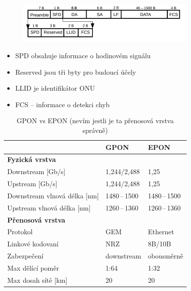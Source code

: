 \begin{figure} [h]
    \centering
    \includegraphics[width=0.8\textwidth]{snimky/EPONframe.png}
\end{figure}

\begin{itemize}
    \item SPD obsahuje informace o hodinovém signálu
    \item Reserved jsou tři byty pro budoucí účely
    \item LLID je identifikátor ONU
    \item FCS -- informace o detekci chyb
\end{itemize}

\clearpage

\begin{table}[ht]
    \centering
    \caption{GPON vs EPON (nevím jestli je ta přenosová vrstva správně)}
    \begin{tabular}{|l|l|l|}
        \hline
                                     & GPON           & EPON           \\\hline\hline
        \textbf{Fyzická vrstva}      &                &                \\\hline\hline
        Downstream [Gb/s]            & 1,244/2,488    & 1,25           \\\hline
        Upstream [Gb/s]              & 1,244/2,488    & 1,25           \\\hline
        Downstream vlnová délka [nm] & 1480\,--\,1500 & 1480\,--\,1500 \\\hline
        Upstream vlnová délka [nm]   & 1260\,--\,1360 & 1260\,--\,1360 \\\hline\hline
        \textbf{Přenosová vrstva}    &                &                \\\hline\hline
        Protokol                     & GEM            & Ethernet       \\\hline
        Linkové kodovaní             & NRZ            & 8B/10B         \\\hline
        Zabezpečení                  & downstream     & obousměrně     \\\hline
        Max dělící poměr             & 1:64           & 1:32           \\\hline
        Max dosah sítě [km]          & 20             & 20             \\\hline
    \end{tabular}
\end{table}

